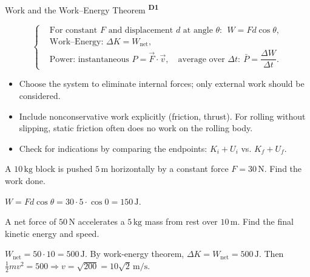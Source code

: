 ﻿\documentclass[12pt,a4paper]{article}
\providecommand{\KPFormulas}{}
\providecommand{\KPHeuristics}{}
\providecommand{\KPProblems}{}
\newcommand{\DOne}{\texorpdfstring{\textsuperscript{\textbf{D1}}}{ D1}}
\begin{document}
\begin{KnowledgePoint}{Work and the Work--Energy Theorem \DOne}
  \KPFormulas
\begin{formulabox}
  \[
  \left\{\begin{aligned}
    &\text{For constant }F\text{ and displacement }d\text{ at angle }\theta:\ \ W=Fd\cos\theta,\\
    &\text{Work--Energy: }\Delta K=W_{\text{net}},\\
    &\text{Power: instantaneous }P=\vec F\cdot\vec v,\quad \text{average over }\Delta t:\ \bar P=\dfrac{\Delta W}{\Delta t}.
  \end{aligned}\right.
  \]
\end{formulabox}

  \KPHeuristics
\begin{heuristicsbox}
\begin{itemize}[leftmargin=*]
  \item Choose the system to eliminate internal forces; only external work should be considered.
  \item Include nonconservative work explicitly (friction, thrust). For rolling without slipping, static friction often does no work on the rolling body.
  \item Check for indications by comparing the endpoints: $K_i+U_i$ vs. $K_f+U_f$.
\end{itemize}
\end{heuristicsbox}

  \KPProblems
\begin{cheatproblem}
  A $10\,\text{kg}$ block is pushed $5\,\text{m}$ horizontally by a constant force $F=30\,\text{N}$. Find the work done.
\begin{solutionbox}
  $W=Fd\cos\theta=30\cdot5\cdot\cos0=150\,\text{J}$.
\end{solutionbox}
\end{cheatproblem}
\begin{cheatproblem}
  A net force of $50\,\text{N}$ accelerates a $5\,\text{kg}$ mass from rest over $10\,\text{m}$. Find the final kinetic energy and speed.
\begin{solutionbox}
  $W_{\text{net}}=50\cdot10=500\,\text{J}$. By work-energy theorem, $\Delta K=W_{\text{net}}=500\,\text{J}$. Then $\tfrac12mv^2=500\Rightarrow v=\sqrt{200}=10\sqrt2\,\text{m/s}$.
\end{solutionbox}
\end{cheatproblem}
\end{KnowledgePoint}
\end{document}

